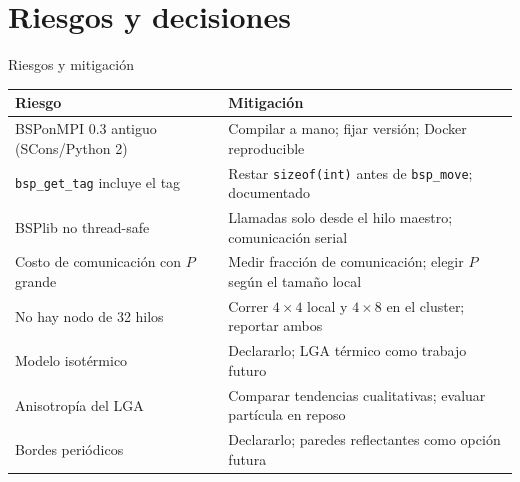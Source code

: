 \documentclass[aspectratio=169]{beamer}
\begin{document}
\section{Riesgos y decisiones}

\begin{frame}{Riesgos y mitigación}
  \centering
  \scriptsize
  \begin{tabular}{>{\raggedright\arraybackslash}p{4.2cm}>{\raggedright\arraybackslash}p{9.0cm}}
    \toprule
    Riesgo & Mitigación \\
    \midrule
    BSPonMPI 0.3 antiguo (SCons/Python 2) &
    Compilar a mano; fijar versión; Docker reproducible \\
    \texttt{bsp\_get\_tag} incluye el tag &
    Restar \texttt{sizeof(int)} antes de \texttt{bsp\_move}; documentado \\
    BSPlib no thread-safe &
    Llamadas solo desde el hilo maestro; comunicación serial \\
    Costo de comunicación con $P$ grande &
    Medir fracción de comunicación; elegir $P$ según el tamaño local \\
    No hay nodo de 32 hilos &
    Correr $4\times4$ local y $4\times8$ en el cluster; reportar ambos \\
    Modelo isotérmico &
    Declararlo; LGA térmico como trabajo futuro \\
    Anisotropía del LGA &
    Comparar tendencias cualitativas; evaluar partícula en reposo \\
    Bordes periódicos &
    Declararlo; paredes reflectantes como opción futura \\
    \bottomrule
  \end{tabular}
\end{frame}
\end{document}
